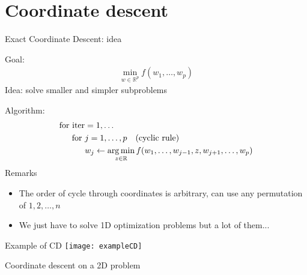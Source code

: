 
\section{Coordinate descent}


\begin{frame}{Exact Coordinate Descent: idea}

    Goal:
    \begin{align*}
        \min_{w \in \mathbb{R}^p} f(w_1, \dots, w_p)
    \end{align*}
    \pause
    Idea: solve \alert{smaller} and \alert{simpler subproblems}
    \pause

    Algorithm:
    \begin{equation*}
        \begin{aligned}
        \text{for iter}
            & = 1, \dots
            \\
            \text{for }
            & j = 1, \dots, p \quad \text{(cyclic rule)}
            \\
                &
                w_{j}
                \leftarrow
                \mathop{\mathrm{arg\,min}}_{z \in \mathbb{R}}
                f(w_1, \ldots, w_{j-1}, z, w_{j+1}, \ldots, w_p)
         \end{aligned}
    \end{equation*}
    \pause
    Remarks
    \begin{itemize}
        \item The order of cycle through coordinates is arbitrary, can use any
    permutation of ${1, 2, \dots, n}$
        \item We just have to solve 1D optimization problems but a lot of them...
    \end{itemize}
\end{frame}

\begin{frame}{Example of CD}
    \centering
    \texttt{[image: exampleCD]}

    Coordinate descent on a 2D problem
\end{frame}

